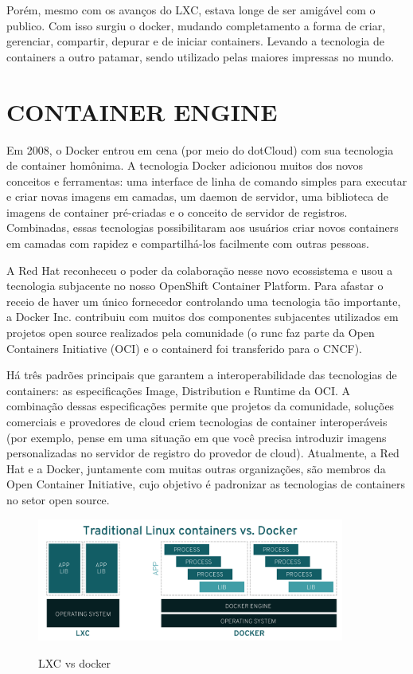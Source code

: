 Porém, mesmo com os avanços do LXC, estava longe de ser amigável com o publico. Com isso surgiu o docker, mudando completamento a forma de criar, gerenciar, compartir, depurar e de iniciar containers. Levando a tecnologia de containers a outro patamar, sendo utilizado pelas maiores impressas no mundo. 

\section{CONTAINER ENGINE}
\label{sec:countainerEngine}

Em 2008, o Docker entrou em cena (por meio do dotCloud) com sua tecnologia de container homônima. A tecnologia Docker adicionou muitos dos novos conceitos e ferramentas: uma interface de linha de comando simples para executar e criar novas imagens em camadas, um daemon de servidor, uma biblioteca de imagens de container pré-criadas e o conceito de servidor de registros. Combinadas, essas tecnologias possibilitaram aos usuários criar novos containers em camadas com rapidez e compartilhá-los facilmente com outras pessoas.

A Red Hat reconheceu o poder da colaboração nesse novo ecossistema e usou a tecnologia subjacente no nosso OpenShift Container Platform. Para afastar o receio de haver um único fornecedor controlando uma tecnologia tão importante, a Docker Inc. contribuiu com muitos dos componentes subjacentes utilizados em projetos open source realizados pela comunidade (o runc faz parte da Open Containers Initiative (OCI) e o containerd foi transferido para o CNCF).

Há três padrões principais que garantem a interoperabilidade das tecnologias de containers: as especificações Image, Distribution e Runtime da OCI. A combinação dessas especificações permite que projetos da comunidade, soluções comerciais e provedores de cloud criem tecnologias de container interoperáveis (por exemplo, pense em uma situação em que você precisa introduzir imagens personalizadas no servidor de registro do provedor de cloud). Atualmente, a Red Hat e a Docker, juntamente com muitas outras organizações, são membros da Open Container Initiative, cujo objetivo é padronizar as tecnologias de containers no setor open source.

\begin{figure}[!htb]
	\centering
	\caption{LXC vs docker}
	\includegraphics[width=0.9\textwidth]{figuras/traditional-linux-containers-vs-docker_0.png}
	\label{fig:lxc-vs-docker}
\end{figure}


